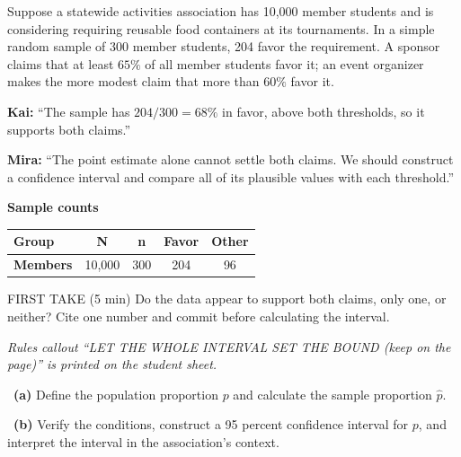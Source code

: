 \documentclass[11pt]{article}
\begin{document}
Suppose a statewide activities association has 10,000 member students and is considering requiring reusable food containers at its tournaments. In a simple random sample of 300 member students, 204 favor the requirement. A sponsor claims that at least $65\%$ of all member students favor it; an event organizer makes the more modest claim that more than $60\%$ favor it.\par\smallskip \textbf{Kai:} ``The sample has $204/300=68\%$ in favor, above both thresholds, so it supports both claims.''\par \textbf{Mira:} ``The point estimate alone cannot settle both claims. We should construct a confidence interval and compare all of its plausible values with each threshold.''\par
\begin{center}
\textbf{Sample counts}\par\smallskip
\begin{tabular}{|l|c|c|c|c|}
\hline
\textbf{Group} & \textbf{N} & \textbf{n} & \textbf{Favor} & \textbf{Other} \\ \hline
\textbf{Members} & 10,000 & 300 & 204 & 96 \\ \hline
\end{tabular}
\end{center}
\begin{firsttakebox}{FIRST TAKE (5 min)}
Do the data appear to support both claims, only one, or neither? Cite one number and commit before calculating the interval.\par
{}
\end{firsttakebox}

\textit{Rules callout ``LET THE WHOLE INTERVAL SET THE BOUND (keep on the page)'' is printed on the student sheet.}\par\medskip

~\textbf{(a)} Define the population proportion $p$ and calculate the sample proportion $\hat p$.\par
{}

~\textbf{(b)} Verify the conditions, construct a 95 percent confidence interval for $p$, and interpret the interval in the association's context.\par
{}
\end{document}
